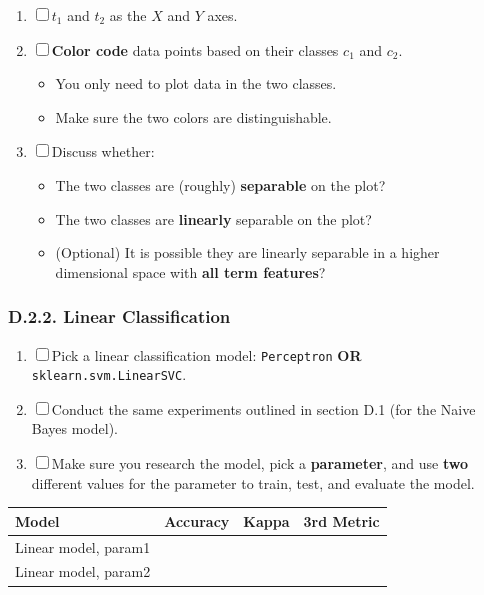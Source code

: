\documentclass[
  letterpaper,
]{scrbook}
\newcounter{none} %
\providecommand{\tightlist}{%
  \setlength{\itemsep}{0pt}\setlength{\parskip}{0pt}}
\begin{document}
\begin{enumerate}
\def\labelenumi{\arabic{enumi}.}
\tightlist
\item
  ☐ \(t_1\) and \(t_2\) as the \(X\) and \(Y\) axes.
\item
  ☐ \textbf{Color code} data points based on their classes \(c_1\) and
  \(c_2\).

  \begin{itemize}
  \tightlist
  \item
    You only need to plot data in the two classes.
  \item
    Make sure the two colors are distinguishable.
  \end{itemize}
\item
  ☐ Discuss whether:

  \begin{itemize}
  \tightlist
  \item
    The two classes are (roughly) \textbf{separable} on the plot?
  \item
    The two classes are \textbf{linearly} separable on the plot?
  \item
    (Optional) It is possible they are linearly separable in a higher
    dimensional space with \textbf{all term features}?
  \end{itemize}
\end{enumerate}

\subsubsection*{D.2.2. Linear
Classification}\label{d.2.2.-linear-classification}

\begin{enumerate}
\def\labelenumi{\arabic{enumi}.}
\tightlist
\item
  ☐ Pick a linear classification model: \texttt{Perceptron} \textbf{OR}
  \texttt{sklearn.svm.LinearSVC}.
\item
  ☐ Conduct the same experiments outlined in section D.1 (for the Naive
  Bayes model).
\item
  ☐ Make sure you research the model, pick a \textbf{parameter}, and use
  \textbf{two} different values for the parameter to train, test, and
  evaluate the model.
\end{enumerate}

{\def\LTcaptype{none} %
\begin{longtable}[]{@{}llll@{}}
\toprule\noalign{}
Model & Accuracy & Kappa & 3rd Metric \\
\midrule\noalign{}
\endhead
\bottomrule\noalign{}
\endlastfoot
Linear model, param1 & & & \\
Linear model, param2 & & & \\
\end{longtable}
}
\end{document}
